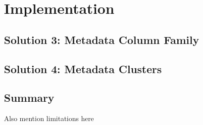 \chapter{Implementation} \label{c:Implementation}



	


 

\section{Solution 3:  Metadata Column Family}\label{s:sol3}



\section{Solution 4:  Metadata Clusters}\label{s:sol4}

\section{Summary}\label{s:solutions-summary}
Also mention limitations here

